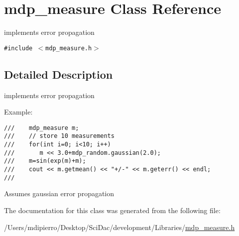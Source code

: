 \hypertarget{classmdp__measure}{
\section{mdp\_\-measure Class Reference}
\label{classmdp__measure}
}
implements error propagation  


{\tt \#include $<$mdp\_\-measure.h$>$}



\subsection{Detailed Description}
implements error propagation 

Example: 

\footnotesize\begin{verbatim}
///    mdp_measure m;
///    // store 10 measurements
///    for(int i=0; i<10; i++) 
///       m << 3.0+mdp_random.gaussian(2.0);
///    m=sin(exp(m)+m);
///    cout << m.getmean() << "+/-" << m.geterr() << endl;
/// \end{verbatim}
\normalsize
 Assumes gaussian error propagation 

The documentation for this class was generated from the following file:\begin{CompactItemize}
\item 
/Users/mdipierro/Desktop/SciDac/development/Libraries/\hyperlink{mdp__measure_8h}{mdp\_\-measure.h}\end{CompactItemize}
